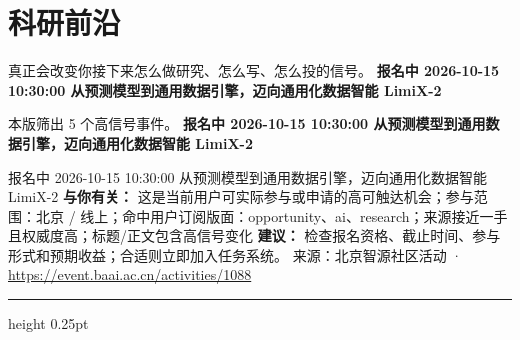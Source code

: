 \documentclass[10.5pt]{ctexart}
\begin{document}
\section*{科研前沿}
{\color{ormuted} 真正会改变你接下来怎么做研究、怎么写、怎么投的信号。}
\vspace{2mm}
{\LARGE\bfseries 报名中 2026-10-15 10:30:00 从预测模型到通用数据引擎，迈向通用化数据智能 LimiX-2}\par
\vspace{1mm}
{\color{ormuted} 本版筛出 5 个高信号事件。}
\vspace{3mm}
{\Large\bfseries 报名中 2026-10-15 10:30:00 从预测模型到通用数据引擎，迈向通用化数据智能 LimiX-2}\par
报名中 2026-10-15 10:30:00 从预测模型到通用数据引擎，迈向通用化数据智能 LimiX-2
\textbf{与你有关：} 这是当前用户可实际参与或申请的高可触达机会；参与范围：北京 / 线上；命中用户订阅版面：opportunity、ai、research；来源接近一手且权威度高；标题/正文包含高信号变化
\textbf{建议：} 检查报名资格、截止时间、参与形式和预期收益；合适则立即加入任务系统。
{\footnotesize\color{ormuted} 来源：北京智源社区活动 · \url{https://event.baai.ac.cn/activities/1088}}
\vspace{4mm}
\hrule height 0.25pt
\vspace{3mm}
\end{document}
